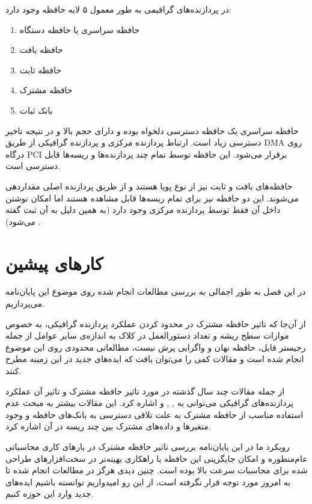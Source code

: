 \documentclass{thesis}
\begin{document}
در پردازنده‌های گرافیمی به طور معمول ۵ لایه حافظه وجود دارد:

\begin{enumerate}
\item
حافظه سراسری
یا حافظه دستگاه
\item
حافظه بافت
\item
حافظه ثابت
\item
حافظه مشترک
\item
بانک ثبات
\end{enumerate}

حافظه سراسری یک حافظه دسترسی دلخواه
بوده و دارای حجم بالا و در نتیجه تاخیر دسترسی زیاد است. ارتباط پردازنده مرکزی و پردازنده گرافیکی از طریق
DMA
روی درگاه
PCI
برقرار می‌شود. این حافظه توسط تمام چند پردازنده‌ها و ریسه‌ها قابل دسترسی است.

حافظه‌های بافت و ثابت نیز از نوع پویا هستند و از طریق پردازنده اصلی مقداردهی می‌شوند. این دو حافظه نیز  برای تمام ریسه‌ها قابل مشاهده هستند اما امکان نوشتن داخل آن فقط توسط پردازنده مرکزی وجود دارد (به همین دلیل به آن ثبت گفته می‌شود)
.

\chapter{
کارهای پیشین
}

در این فصل به طور اجمالی به بررسی مطالعات انجام شده روی موضوع این پایان‌نامه می‌پردازیم.

از آن‌جا که تاثیر حافظه مشترک در محدود کردن عملکرد پردازنده گرافیکی، به خصوص موازات سطح‌ ریشه و تعداد دستورالعمل در کلاک به اندازه‌ی سایر عوامل از جمله رجیستر ‌فایل، حافظه نهان و واگرایی پرش نیست، مطالعاتی محدودی روی این موضوع انجام شده است و مقالات کمی را می‌توان یافت که ایده‌های جدید در این زمینه مطرح کنند.

از جمله مقالات چند سال گذشته در مورد تاثیر حافظه مشترک و تاثیر آن عملکرد پردازنده‌های گرافیکی می‌توانی به
\cite{cite11}
,
\cite{cite12}
,
\cite{cite13}
و
\cite{cite14}
اشاره کرد. این مقالات بیشتر به مبحث عدم استفاده مناسب
از حافظه مشترک به علت تلاقی دسترسی به بانک‌های حافظه و وجود متغیر‌ها و داده‌های مشترک بین چند ریسه در آن اشاره کرد.

 رویکرد ما در این پایان‌نامه بررسی تاثیر حافظه مشترک در بارهای کاری محاسباتی عام‌منظوره و امکان جایگزینی این حافظه با راهکاری بهینه‌تر در  سخت‌افزارهای طراحی شده برای محاسبات سرعت بالا بوده است. چنین دیدی هرگز در مطالعات انجام‌ شده تا به امروز مورد توجه قرار نگرفته است، از این رو امیدواریم توانسته باشیم ایده‌های جدید وارد این حوزه کنیم.
\end{document}

